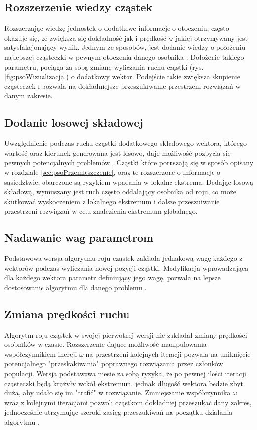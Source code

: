 \subsection{Rozszerzenie wiedzy cząstek}
\label{sec:psoSasiedztwo}
Rozszerzając wiedzę jednostek o dodatkowe informacje o otoczeniu, często okazuje się, że zwiększa się dokładność jak i prędkość w jakiej otrzymywany jest satysfakcjonujący wynik. Jednym ze sposobów, jest dodanie wiedzy o położeniu najlepszej cząsteczki w pewnym otoczeniu danego osobnika \cite{PSOneighbourhood}. Dołożenie takiego parametru, pociąga za sobą zmianę wyliczania ruchu cząstki (rys. \ref{fig:psoWizualizacja}) o dodatkowy wektor. Podejście takie zwiększa skupienie cząsteczek i pozwala na dokładniejsze przeszukiwanie przestrzeni rozwiązań w danym zakresie. 


\subsection{Dodanie losowej składowej}
\label{sec:psoLosowa}
Uwzględnienie podczas ruchu cząstki dodatkowego składowego wektora, którego wartość oraz kierunek generowana jest losowo, daje możliwość pozbycia się pewnych potencjalnych problemów \cite{PSOrandom}. Cząstki które poruszają się w sposób opisany w rozdziale \ref{sec:psoPrzemieszczenie}, oraz te rozszerzone o informacje o sąsiedztwie, obarczone są ryzykiem wpadania w lokalne ekstrema. Dodając losową składową, wymuszany jest ruch często oddalający osobnika od roju, co może skutkować wyskoczeniem z lokalnego ekstremum i dalsze przeszuiwanie przestrzeni rozwiązań w celu znalezienia ekstremum globalnego.


\subsection{Nadawanie wag parametrom}
\label{sec:psoWagi}
Podstawowa wersja algorytmu roju cząstek zakłada jednakową wagę każdego z wektorów podczas wyliczania nowej pozycji cząstki. Modyfikacja wprowadzająca dla każdego wektora parametr definiujący jego wagę, pozwala na lepsze dostosowanie algorytmu dla danego problemu \cite{PSOparams}.


\subsection{Zmiana prędkości ruchu}
\label{sec:psoPredkosc}
Algorytm roju cząstek w swojej pierwotnej wersji nie zakładał zmiany prędkości osobników w czasie. Rozszerzenie dające możliwość manipulowania współczynnikiem inercji $\omega$ na przestrzeni kolejnych iteracji pozwala na uniknięcie potencjalnego "przeskakiwania" poprawnego rozwiązania przez członków populacji. Wersja podstawowa niesie za sobą ryzyka, że po pewnej ilości iteracji cząsteczki będą krążyły wokół ekstremum, jednak długość wektora będzie zbyt duża, aby udało się im "trafić" w rozwiązanie. Zmniejszanie współczynnika $\omega$ wraz z kolejnymi iteracjami pozwoli cząstkom dokładniej przeszukać dany zakres, jednocześnie utrzymując szeroki zasięg przeszukiwań na początku działania algorytmu \cite{PSOvelocity}.

